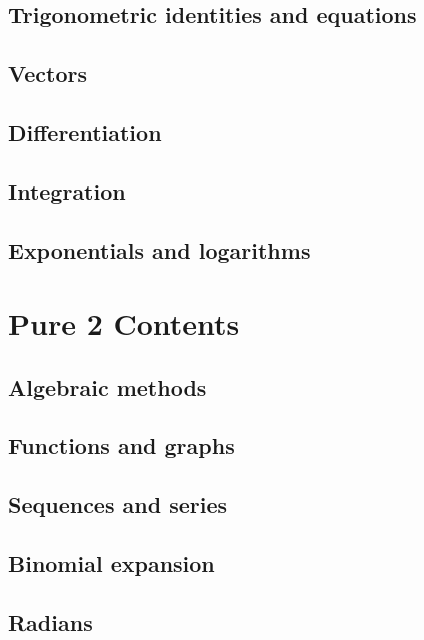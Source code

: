 \documentclass[oneside,fleqn,11pt]{book}
\begin{document}
\chapter{Trigonometric identities and equations}


\chapter{Vectors}


\chapter{Differentiation}


\chapter{Integration}


\chapter{Exponentials and logarithms}


\part{Pure 2 Contents}
\chapter{Algebraic methods}


\chapter{Functions and graphs}


\chapter{Sequences and series}


\chapter{Binomial expansion}


\chapter{Radians}

\end{document}
